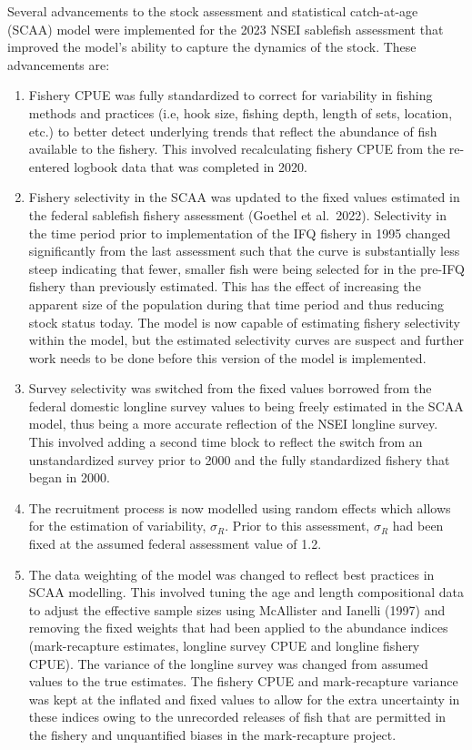 \documentclass[
]{article}
\providecommand{\tightlist}{%
  \setlength{\itemsep}{0pt}\setlength{\parskip}{0pt}}
\begin{document}
Several advancements to the stock assessment and statistical
catch-at-age (SCAA) model were implemented for the 2023 NSEI sablefish
assessment that improved the model's ability to capture the dynamics of
the stock. These advancements are:

\begin{enumerate}
\def\labelenumi{\arabic{enumi}.}
\tightlist
\item
  Fishery CPUE was fully standardized to correct for variability in
  fishing methods and practices (i.e, hook size, fishing depth, length
  of sets, location, etc.) to better detect underlying trends that
  reflect the abundance of fish available to the fishery. This involved
  recalculating fishery CPUE from the re-entered logbook data that was
  completed in 2020.
\item
  Fishery selectivity in the SCAA was updated to the fixed values
  estimated in the federal sablefish fishery assessment (Goethel et
  al.~2022). Selectivity in the time period prior to implementation of
  the IFQ fishery in 1995 changed significantly from the last assessment
  such that the curve is substantially less steep indicating that fewer,
  smaller fish were being selected for in the pre-IFQ fishery than
  previously estimated. This has the effect of increasing the apparent
  size of the population during that time period and thus reducing stock
  status today. The model is now capable of estimating fishery
  selectivity within the model, but the estimated selectivity curves are
  suspect and further work needs to be done before this version of the
  model is implemented.
\item
  Survey selectivity was switched from the fixed values borrowed from
  the federal domestic longline survey values to being freely estimated
  in the SCAA model, thus being a more accurate reflection of the NSEI
  longline survey. This involved adding a second time block to reflect
  the switch from an unstandardized survey prior to 2000 and the fully
  standardized fishery that began in 2000.
\item
  The recruitment process is now modelled using random effects which
  allows for the estimation of variability, \(\sigma_R\). Prior to this
  assessment, \(\sigma_R\) had been fixed at the assumed federal
  assessment value of 1.2.\\
\item
  The data weighting of the model was changed to reflect best practices
  in SCAA modelling. This involved tuning the age and length
  compositional data to adjust the effective sample sizes using
  McAllister and Ianelli (1997) and removing the fixed weights that had
  been applied to the abundance indices (mark-recapture estimates,
  longline survey CPUE and longline fishery CPUE). The variance of the
  longline survey was changed from assumed values to the true estimates.
  The fishery CPUE and mark-recapture variance was kept at the inflated
  and fixed values to allow for the extra uncertainty in these indices
  owing to the unrecorded releases of fish that are permitted in the
  fishery and unquantified biases in the mark-recapture project.
\end{enumerate}
\end{document}
